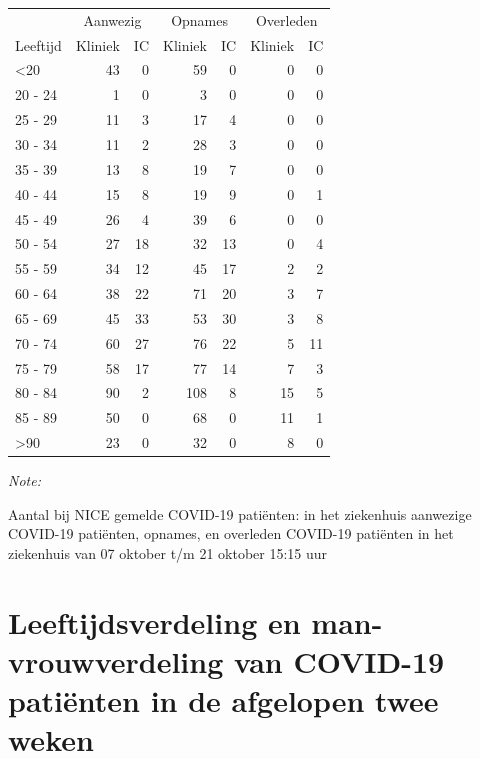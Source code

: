 \documentclass[
  english,
  man,floatsintext]{apa6}
\begin{document}
\begin{table}
\centering\begingroup\fontsize{10}{12}\selectfont

\begin{threeparttable}
\begin{tabular}{lrrrrrr}
\toprule
\multicolumn{1}{c}{ } & \multicolumn{2}{c}{Aanwezig} & \multicolumn{2}{c}{Opnames} & \multicolumn{2}{c}{Overleden} \\
\cmidrule(l{3pt}r{3pt}){2-3} \cmidrule(l{3pt}r{3pt}){4-5} \cmidrule(l{3pt}r{3pt}){6-7}
Leeftijd & Kliniek & IC & Kliniek & IC & Kliniek & IC\\
\midrule
<20 & 43 & 0 & 59 & 0 & 0 & 0\\
20 - 24 & 1 & 0 & 3 & 0 & 0 & 0\\
25 - 29 & 11 & 3 & 17 & 4 & 0 & 0\\
30 - 34 & 11 & 2 & 28 & 3 & 0 & 0\\
35 - 39 & 13 & 8 & 19 & 7 & 0 & 0\\
40 - 44 & 15 & 8 & 19 & 9 & 0 & 1\\
45 - 49 & 26 & 4 & 39 & 6 & 0 & 0\\
50 - 54 & 27 & 18 & 32 & 13 & 0 & 4\\
55 - 59 & 34 & 12 & 45 & 17 & 2 & 2\\
60 - 64 & 38 & 22 & 71 & 20 & 3 & 7\\
65 - 69 & 45 & 33 & 53 & 30 & 3 & 8\\
70 - 74 & 60 & 27 & 76 & 22 & 5 & 11\\
75 - 79 & 58 & 17 & 77 & 14 & 7 & 3\\
80 - 84 & 90 & 2 & 108 & 8 & 15 & 5\\
85 - 89 & 50 & 0 & 68 & 0 & 11 & 1\\
>90 & 23 & 0 & 32 & 0 & 8 & 0\\
\bottomrule
\end{tabular}
\begin{tablenotes}
\item \textit{Note: } 
\item Aantal bij NICE gemelde COVID-19 patiënten: in het ziekenhuis aanwezige COVID-19 patiënten, opnames, en overleden COVID-19 patiënten in het ziekenhuis van 07 oktober t/m 21 oktober 15:15 uur
\end{tablenotes}
\end{threeparttable}
\endgroup{}
\end{table}

\newpage

\hypertarget{leeftijdsverdeling-en-man-vrouwverdeling-van-covid-19-patiuxebnten-in-de-afgelopen-twee-weken}{%
\section{Leeftijdsverdeling en man-vrouwverdeling van COVID-19 patiënten in de afgelopen twee weken}\label{leeftijdsverdeling-en-man-vrouwverdeling-van-covid-19-patiuxebnten-in-de-afgelopen-twee-weken}}
\end{document}
